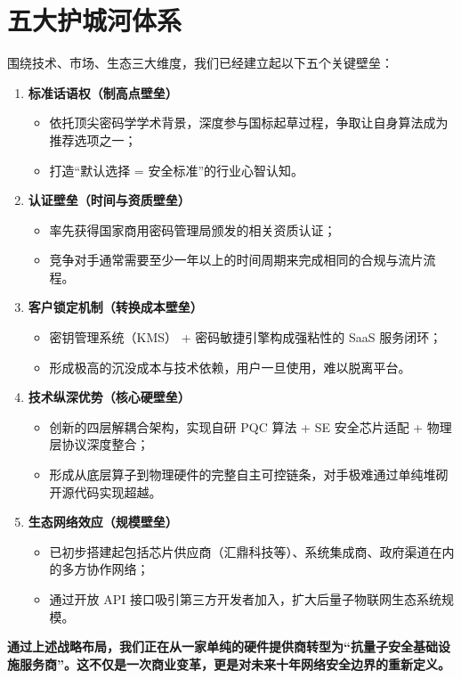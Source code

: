 \section{五大护城河体系}

围绕技术、市场、生态三大维度，我们已经建立起以下五个关键壁垒：

\begin{enumerate}[label=\textbf{\arabic*.}]
	\item \textbf{标准话语权（制高点壁垒）}
	\begin{itemize}
		\item 依托顶尖密码学学术背景，深度参与国标起草过程，争取让自身算法成为推荐选项之一；
		\item 打造“默认选择 = 安全标准”的行业心智认知。
	\end{itemize}
	
	\item \textbf{认证壁垒（时间与资质壁垒）}
	\begin{itemize}
		\item 率先获得国家商用密码管理局颁发的相关资质认证；
		\item 竞争对手通常需要至少一年以上的时间周期来完成相同的合规与流片流程。
	\end{itemize}
	
	\item \textbf{客户锁定机制（转换成本壁垒）}
	\begin{itemize}
		\item 密钥管理系统（KMS） + 密码敏捷引擎构成强粘性的 SaaS 服务闭环；
		\item 形成极高的沉没成本与技术依赖，用户一旦使用，难以脱离平台。
	\end{itemize}
	
	\item \textbf{技术纵深优势（核心硬壁垒）}
	\begin{itemize}
		\item 创新的四层解耦合架构，实现自研 PQC 算法 + SE 安全芯片适配 + 物理层协议深度整合；
		\item 形成从底层算子到物理硬件的完整自主可控链条，对手极难通过单纯堆砌开源代码实现超越。
	\end{itemize}
	
	\item \textbf{生态网络效应（规模壁垒）}
	\begin{itemize}
		\item 已初步搭建起包括芯片供应商（汇鼎科技等）、系统集成商、政府渠道在内的多方协作网络；
		\item 通过开放 API 接口吸引第三方开发者加入，扩大后量子物联网生态系统规模。
	\end{itemize}
\end{enumerate}

\vspace{1cm}
\begin{center}
	{\songti\xiaosi \textbf{通过上述战略布局，我们正在从一家单纯的硬件提供商转型为“抗量子安全基础设施服务商”。这不仅是一次商业变革，更是对未来十年网络安全边界的重新定义。}}
\end{center}